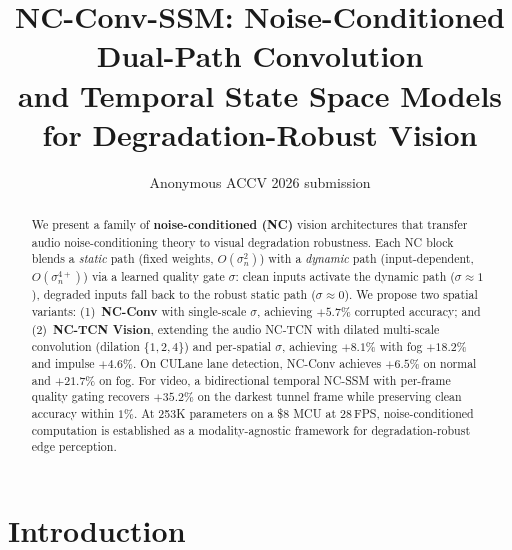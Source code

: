 \documentclass[runningheads]{llncs}
\begin{document}
\title{NC-Conv-SSM: Noise-Conditioned Dual-Path Convolution\\and Temporal State Space Models for Degradation-Robust Vision}


\author{Anonymous ACCV 2026 submission}

\maketitle

\begin{abstract}
We present a family of \textbf{noise-conditioned (NC)} vision architectures that transfer audio noise-conditioning theory to visual degradation robustness.
Each NC block blends a \textcolor{fixcolor}{\emph{static}} path (fixed weights, $O(\sigma_n^2)$) with a \textcolor{dyncolor}{\emph{dynamic}} path (input-dependent, $O(\sigma_n^{4+})$) via a learned quality gate $\sigma$: clean inputs activate the dynamic path ($\sigma{\approx}1$), degraded inputs fall back to the robust static path ($\sigma{\approx}0$).
We propose two spatial variants: (1)~\textbf{NC-Conv} with single-scale $\sigma$, achieving $+5.7\%$ corrupted accuracy; and (2)~\textbf{NC-TCN Vision}, extending the audio NC-TCN with dilated multi-scale convolution (dilation $\{1,2,4\}$) and per-spatial $\sigma$, achieving $\mathbf{+8.1\%}$ with fog $+18.2\%$ and impulse $+4.6\%$.
On CULane lane detection, NC-Conv achieves $+6.5\%$ on normal and $\mathbf{+21.7\%}$ on fog.
For video, a \textcolor{tempcolor}{bidirectional temporal NC-SSM} with per-frame quality gating recovers $\mathbf{+35.2\%}$ on the darkest tunnel frame while preserving clean accuracy within $1\%$.
At 253K parameters on a \$8 MCU at 28\,FPS, noise-conditioned computation is established as a modality-agnostic framework for degradation-robust edge perception.

\end{abstract}

\section{Introduction}
\label{sec:intro}
\end{document}
